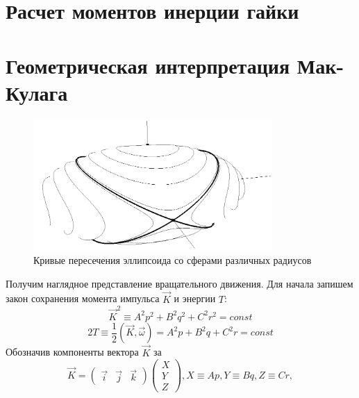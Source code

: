 \documentclass{article}
\begin{document}
\section{Расчет моментов инерции гайки}


\section{Геометрическая интерпретация Мак-Кулага}
\begin{figure}[h]
\includegraphics[height=5cm]{ellipsoid}
\caption{Кривые пересечения эллипсоида со сферами различных радиусов}
\end{figure}
Получим наглядное представление вращательного движения. Для начала запишем закон сохранения момента импульса \begin{math} \vec{K} \end{math} и энергии \begin{math} T \end{math}:
\begin{equation}
\label{angularMomentumInv}
\vec{K}^2\equiv A^2p^2+B^2q^2+C^2r^2=const
\end{equation}
\begin{equation}
\label{energyInv}
2T\equiv\frac{1}{2}\left(\vec{K},\vec{\omega}\right)=A^2p+B^2q+C^2r=const
\end{equation}
Обозначив компоненты вектора \begin{math} \vec{K} \end{math} за
\begin{equation}
\vec{K}=
\left(
\begin{array}{lcr}
\vec{i} & \vec{j} & \vec{k}
\end{array}
\right)
\left(
\begin{array}{lcr}
X\\
Y\\
Z
\end{array}
\right),
X\equiv Ap,Y\equiv Bq,Z\equiv Cr,
\end{equation}
\end{document}
